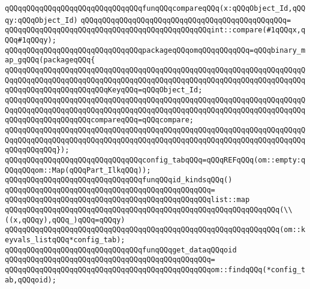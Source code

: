 \newline
\verb|qQQqqQQqqQQqqQQqqQQqqQQqqQQqqQQqfunqQQqcompareqQQq(x:qQQqObject_Id,qQQqy:qQQqObject_Id)|\newline
\verb|qQQqqQQqqQQqqQQqqQQqqQQqqQQqqQQqqQQqqQQqqQQqqQQq=|\newline
\verb|qQQqqQQqqQQqqQQqqQQqqQQqqQQqqQQqqQQqqQQqqQQqqQQqint::compare(#1qQQqx,qQQq#1qQQqy);|\newline
\newline
\verb|qQQqqQQqqQQqqQQqqQQqqQQqqQQqqQQqpackageqQQqomqQQqqQQqqQQq=qQQqbinary_map_gqQQq(packageqQQq{|\newline
\verb|qQQqqQQqqQQqqQQqqQQqqQQqqQQqqQQqqQQqqQQqqQQqqQQqqQQqqQQqqQQqqQQqqQQqqQQqqQQqqQQqqQQqqQQqqQQqqQQqqQQqqQQqqQQqqQQqqQQqqQQqqQQqqQQqqQQqqQQqqQQqqQQqqQQqqQQqqQQqqQQqqQQqKeyqQQq=qQQqObject_Id;|\newline
\verb|qQQqqQQqqQQqqQQqqQQqqQQqqQQqqQQqqQQqqQQqqQQqqQQqqQQqqQQqqQQqqQQqqQQqqQQqqQQqqQQqqQQqqQQqqQQqqQQqqQQqqQQqqQQqqQQqqQQqqQQqqQQqqQQqqQQqqQQqqQQqqQQqqQQqqQQqqQQqqQQqcompareqQQq=qQQqcompare;|\newline
\verb|qQQqqQQqqQQqqQQqqQQqqQQqqQQqqQQqqQQqqQQqqQQqqQQqqQQqqQQqqQQqqQQqqQQqqQQqqQQqqQQqqQQqqQQqqQQqqQQqqQQqqQQqqQQqqQQqqQQqqQQqqQQqqQQqqQQqqQQqqQQqqQQqqQQqqQQq});|\newline
\newline
\verb|qQQqqQQqqQQqqQQqqQQqqQQqqQQqqQQqconfig_tabqQQq=qQQqREFqQQq(om::empty:qQQqqQQqom::Map(qQQqPart_IlkqQQq));|\newline
\newline
\verb|qQQqqQQqqQQqqQQqqQQqqQQqqQQqqQQqfunqQQqid_kindsqQQq()|\newline
\verb|qQQqqQQqqQQqqQQqqQQqqQQqqQQqqQQqqQQqqQQqqQQqqQQq=|\newline
\verb|qQQqqQQqqQQqqQQqqQQqqQQqqQQqqQQqqQQqqQQqqQQqqQQqlist::map|\newline
\verb|qQQqqQQqqQQqqQQqqQQqqQQqqQQqqQQqqQQqqQQqqQQqqQQqqQQqqQQqqQQqqQQq(\\((x,qQQqy),qQQq_)qQQq=qQQqy)|\newline
\verb|qQQqqQQqqQQqqQQqqQQqqQQqqQQqqQQqqQQqqQQqqQQqqQQqqQQqqQQqqQQqqQQq(om::keyvals_listqQQq*config_tab);|\newline
\newline
\verb|qQQqqQQqqQQqqQQqqQQqqQQqqQQqqQQqfunqQQqget_dataqQQqoid|\newline
\verb|qQQqqQQqqQQqqQQqqQQqqQQqqQQqqQQqqQQqqQQqqQQqqQQq=|\newline
\verb|qQQqqQQqqQQqqQQqqQQqqQQqqQQqqQQqqQQqqQQqqQQqqQQqom::findqQQq(*config_tab,qQQqoid);|\newline
